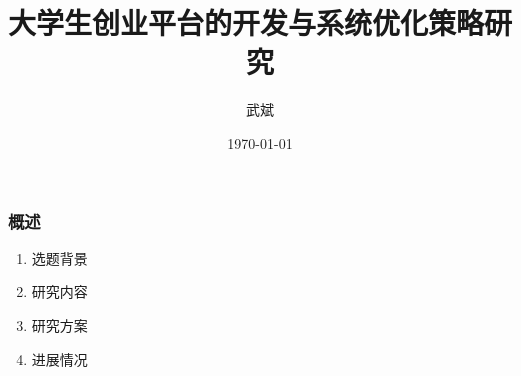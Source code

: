 \documentclass{beamer}
\title{大学生创业平台的开发与系统优化策略研究}
\author{武斌}
\institute
{
  电子系~中国海洋大学
  \and
   Department electronic engineering \\
  Ocean University Of China
}
\date{\today}
\begin{document}
\begin{frame}
  \titlepage
\end{frame}


\begin{frame}
  \frametitle{概述}
  \begin{enumerate}
    \item<1-> 选题背景
    \item<1-> 研究内容
    \item<1-> 研究方案
    \item<1-> 进展情况
  \end{enumerate}
\end{frame}
\end{document}
